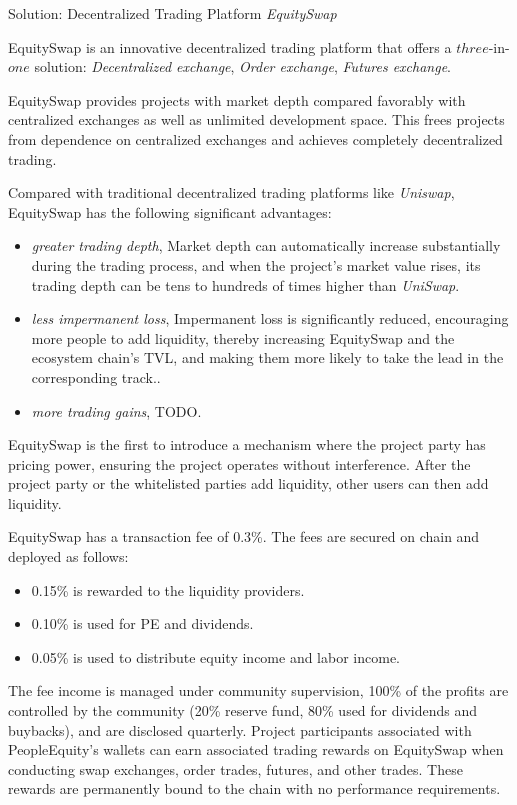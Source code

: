 \documentclass{article}
\begin{document}
Solution: Decentralized Trading Platform \emph{EquitySwap}

EquitySwap is an innovative decentralized trading platform that offers a $three$-in-$one$ solution: \emph{Decentralized exchange}, \emph{Order exchange}, \emph{Futures exchange}.

EquitySwap provides projects with market depth compared favorably with centralized exchanges as well as unlimited development space. This frees projects from dependence on centralized exchanges and achieves completely decentralized trading.

Compared with traditional decentralized trading platforms like \emph{Uniswap}, EquitySwap has the following significant advantages: 

\begin{itemize}
   \item \emph{greater trading depth}, Market depth can automatically increase substantially during the trading process, and when the project's market value rises, its trading depth can be tens to hundreds of times higher than \emph{UniSwap}.
   \item \emph{less impermanent loss}, Impermanent loss is significantly reduced, encouraging more people to add liquidity, thereby increasing EquitySwap and the ecosystem chain's TVL, and making them more likely to take the lead in the corresponding track..
   \item \emph{more trading gains}, TODO.
\end{itemize}

EquitySwap is the first to introduce a mechanism where the project party has pricing power, ensuring the project operates without interference. After the project party or the whitelisted parties add liquidity, other users can then add liquidity. 

EquitySwap has a transaction fee of 0.3\%. The fees are secured on chain and deployed as follows: 

\begin{itemize}
   \item 0.15\% is rewarded to the liquidity providers.
   \item 0.10\% is used for PE and dividends.
   \item 0.05\% is used to distribute equity income and labor income.  
\end{itemize}

The fee income is managed under community supervision, 100\% of the profits are controlled by the community (20\% reserve fund, 80\% used for dividends and buybacks), and are disclosed quarterly. Project participants associated with PeopleEquity's wallets can earn associated trading rewards on EquitySwap when conducting swap exchanges, order trades, futures, and other trades. These rewards are permanently bound to the chain with no performance requirements.
\end{document}
